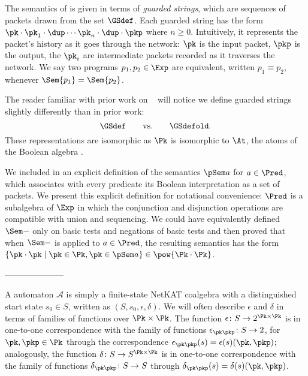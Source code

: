 The semantics of \NetKAT is given in terms of \emph{guarded strings},
which are sequences of packets drawn from the set $\GSdef$. Each
guarded string has the form $\pk \cdot \pk_1\cdot \dup \cdots \pk_n
\cdot \dup \cdot \pkp$ where $n\geq 0$. Intuitively, it represents the
packet's history as it goes through the network: $\pk$ is the input
packet, $\pkp$ is the output, the $\pk_i$ are intermediate packets
recorded as it traverses the network. We say two \NetKAT programs
$p_1, p_2 \in \Exp$ are equivalent, written $p_1 \equiv p_2$, whenever
$\Sem{p_1} = \Sem{p_2}$.

\begin{remark}[Atoms]
The reader familiar with prior work on \NetKAT~\cite{netkat} will
notice we define guarded strings slightly differently than in prior
work:
\[
\GSdef \qquad\text{vs.}\qquad \GSdefold.
\]
These representations are isomorphic as $\Pk$ is isomorphic to $\At$,
the atoms of the Boolean algebra \Pred.
\end{remark}

\begin{remark}
We included in  an explicit definition of the
semantics $\pSem a$ for $a\in\Pred$, which associates with every
predicate its Boolean interpretation as a set of packets. We present
this explicit definition for notational convenience: $\Pred$ is a
subalgebra of $\Exp$ in which the conjunction and disjunction
operations are compatible with union and sequencing. We could have
equivalently defined $\Sem -$ only on basic tests and negations of
basic tests and then proved that when $\Sem -$ is applied to $a\in
\Pred$, the resulting semantics has the form $\{\pk\cdot\pk \mid \pk
\in \Pk, \pk \in \pSem a\} \in \pow{\Pk\cdot\Pk}$.
\end{remark}


---------------------

A \NetKAT automaton $\mathcal{A}$ is simply a
finite-state NetKAT coalgebra with a distinguished start state $s_0\in
S$, written as $(S, s_0, \epsilon, \delta)$. We will often describe
$\epsilon$ and $\delta$ in terms of families of functions over
$\Pk\times\Pk$. The function $\epsilon\colon S \to 2^{\Pk \times \Pk}$
is in one-to-one correspondence with the family of functions
$\epsilon_{\pk\pkp} \colon S \to 2$, for $\pk,\pkp\in\Pk$ through the
correspondence $ \epsilon_{\pk\pkp} (s) = \epsilon(s)(\pk,\pkp)$;
analogously, the function $\delta\colon S \to S^{\Pk \times \Pk}$ is
in one-to-one correspondence with the family of functions
$\delta_{\pk\pkp} \colon S \to S$ through $\delta_{\pk\pkp}(s) =
\delta (s)(\pk,\pkp)$.

